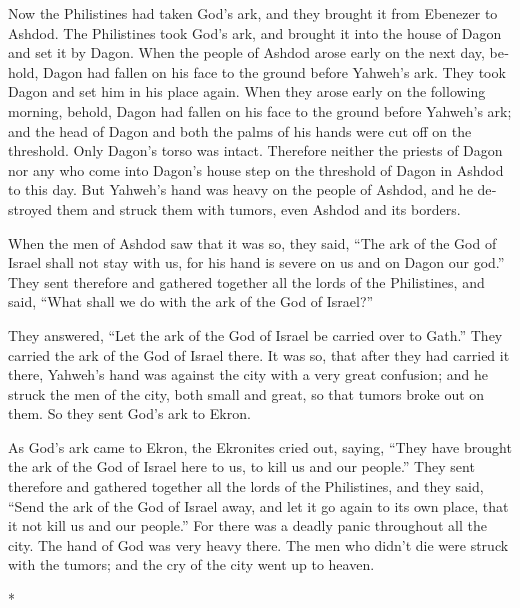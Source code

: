 \begin{paracol}{2}
\begin{otherlanguage}{english}
 Now the Philistines had taken God's ark, and they brought
it from Ebenezer to Ashdod.  The Philistines took God's
ark, and brought it into the house of Dagon and set it by Dagon.
 When the people of Ashdod arose early on the next day,
behold, Dagon had fallen on his face to the ground before Yahweh's ark.
They took Dagon and set him in his place again.  When they
arose early on the following morning, behold, Dagon had fallen on his
face to the ground before Yahweh's ark; and the head of Dagon and both
the palms of his hands were cut off on the threshold. Only Dagon's torso
was intact.  Therefore neither the priests of Dagon nor
any who come into Dagon's house step on the threshold of Dagon in Ashdod
to this day.  But Yahweh's hand was heavy on the people of
Ashdod, and he destroyed them and struck them with tumors, even Ashdod
and its borders.

 When the men of Ashdod saw that it was so, they said,
``The ark of the God of Israel shall not stay with us, for his hand is
severe on us and on Dagon our god.''  They sent therefore
and gathered together all the lords of the Philistines, and said, ``What
shall we do with the ark of the God of Israel?''

They answered, ``Let the ark of the God of Israel be carried over to
Gath.'' They carried the ark of the God of Israel there. 
It was so, that after they had carried it there, Yahweh's hand was
against the city with a very great confusion; and he struck the men of
the city, both small and great, so that tumors broke out on them.
 So they sent God's ark to Ekron.

As God's ark came to Ekron, the Ekronites cried out, saying, ``They have
brought the ark of the God of Israel here to us, to kill us and our
people.''  They sent therefore and gathered together all
the lords of the Philistines, and they said, ``Send the ark of the God
of Israel away, and let it go again to its own place, that it not kill
us and our people.'' For there was a deadly panic throughout all the
city. The hand of God was very heavy there.  The men who
didn't die were struck with the tumors; and the cry of the city went up
to heaven.

\end{otherlanguage}

\switchcolumn[0]*

\hypertarget{resoluciuxf3n-de-los-filisteos-sobre-el-regreso-del-arca}{%
}
\end{paracol}
